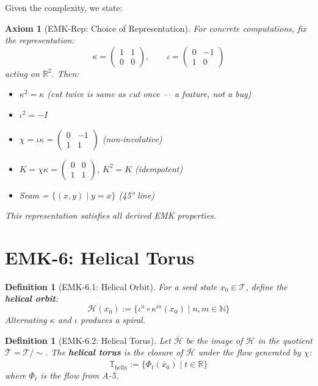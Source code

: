 \documentclass[12pt, oneside]{article}
\newtheorem{definition}[theorem]{Definition}
\newtheorem{axiom}[theorem]{Axiom}
\newcommand{\T}{\mathcal{T}}
\begin{document}
Given the complexity, we state:

\begin{axiom}[EMK-Rep: Choice of Representation]
For concrete computations, fix the representation:
\[
\kappa = \begin{pmatrix} 1 & 1 \\ 0 & 0 \end{pmatrix},\qquad
\iota = \begin{pmatrix} 0 & -1 \\ 1 & 0 \end{pmatrix}
\]
acting on $\mathbb{R}^2$. Then:
\begin{itemize}
    \item $\kappa^2 = \kappa$ (cut twice is same as cut once — a feature, not a bug)
    \item $\iota^2 = -I$
    \item $\chi = \iota \kappa = \begin{pmatrix} 0 & -1 \\ 1 & 1 \end{pmatrix}$ (non-involutive)
    \item $K = \chi \kappa = \begin{pmatrix} 0 & 0 \\ 1 & 1 \end{pmatrix}$, $K^2 = K$ (idempotent)
    \item Seam = $\{ (x,y) \mid y = x \}$ (45° line)
\end{itemize}
This representation satisfies all derived EMK properties.
\end{axiom}

\section{EMK-6: Helical Torus}

\begin{definition}[EMK-6.1: Helical Orbit]
For a seed state $x_0 \in \T$, define the \textbf{helical orbit}:
\[
\mathcal{H}(x_0) := \{ \iota^n \circ \kappa^m(x_0) \mid n,m \in \mathbb{N} \}
\]
Alternating $\kappa$ and $\iota$ produces a spiral.
\end{definition}

\begin{definition}[EMK-6.2: Helical Torus]
Let $\bar{\mathcal{H}}$ be the image of $\mathcal{H}$ in the quotient $\bar{\T} = \T/\!\sim$. The \textbf{helical torus} is the closure of $\bar{\mathcal{H}}$ under the flow generated by $\chi$:
\[
\mathbb{T}_{\text{helix}} := \overline{\{ \Phi_t(\bar{x}_0) \mid t \in \mathbb{R} \}}
\]
where $\Phi_t$ is the flow from A-5.
\end{definition}
\end{document}

